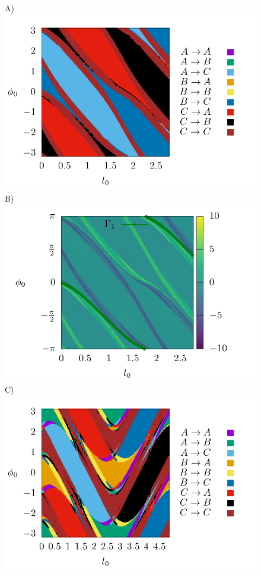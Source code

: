 \documentclass[10pt,aps,onecolumn,superscriptaddress]{revtex4-2}
\begin{document}
\begin{figure}[htbp]
	A)\includegraphics[scale=0.35]{fate_map_ds_gamma1E_0021.png}
	B)\includegraphics[scale=0.35]{ld_action_ds_gamma1_E_0021.png}
	C)\includegraphics[scale=0.35]{fate_map_ds_gamma2E_0021.png}

\end{figure}
\end{document}
